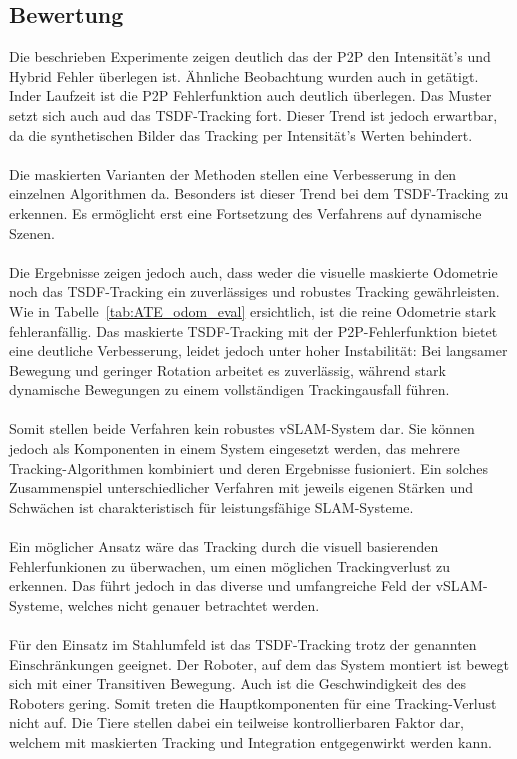 \documentclass[12pt,DIV=15,BCOR=15mm,twoside,headsepline,abstract=true,listof=totoc,bibliography=totoc]{scrreprt}
\theoremstyle{remark}    %
\begin{document}
    \subsection{Bewertung}
    Die beschrieben Experimente zeigen deutlich das der \ac{P2P} den Intensität's und Hybrid Fehler überlegen ist. Ähnliche Beobachtung wurden auch in 
    \cite{rusinkiewicz2001efficient} getätigt.
    Inder Laufzeit ist die \ac{P2P} Fehlerfunktion auch deutlich überlegen. 
    Das Muster setzt sich auch aud das \ac{TSDF}-Tracking fort. Dieser Trend ist jedoch erwartbar, da die synthetischen Bilder das Tracking per Intensität's Werten 
    behindert.\\\\
    Die  maskierten Varianten der Methoden stellen eine Verbesserung in den einzelnen Algorithmen da. Besonders ist dieser Trend bei dem \ac{TSDF}-Tracking
    zu erkennen. Es ermöglicht erst eine Fortsetzung des Verfahrens auf dynamische Szenen.\\\\
    Die Ergebnisse zeigen jedoch auch, dass weder die visuelle maskierte Odometrie noch das \ac{TSDF}-Tracking ein zuverlässiges und robustes Tracking gewährleisten.
    Wie in Tabelle~\ref{tab:ATE_odom_eval} ersichtlich, ist die reine Odometrie stark fehleranfällig.
    Das maskierte \ac{TSDF}-Tracking mit der \ac{P2P}-Fehlerfunktion bietet eine deutliche Verbesserung, leidet jedoch unter hoher Instabilität:
    Bei langsamer Bewegung und geringer Rotation arbeitet es zuverlässig, während stark dynamische Bewegungen zu einem vollständigen Trackingausfall führen.\\\\ 
    Somit stellen beide Verfahren kein robustes \ac{vSLAM}-System dar.
    Sie können jedoch als Komponenten in einem System eingesetzt werden, das mehrere Tracking-Algorithmen kombiniert und deren Ergebnisse fusioniert.
    Ein solches Zusammenspiel unterschiedlicher Verfahren mit jeweils eigenen Stärken und Schwächen ist charakteristisch für leistungsfähige \ac{SLAM}-Systeme.\\\\
    Ein möglicher Ansatz wäre das Tracking durch die visuell basierenden Fehlerfunkionen zu überwachen, um einen möglichen Trackingverlust zu erkennen.
    Das führt jedoch in das diverse und umfangreiche Feld der vSLAM-Systeme, welches nicht genauer betrachtet werden.\\\\
    Für den Einsatz im Stahlumfeld ist das \ac{TSDF}-Tracking trotz der genannten Einschränkungen geeignet. Der Roboter, auf dem das System montiert ist bewegt 
    sich mit einer Transitiven Bewegung. Auch ist die Geschwindigkeit des des Roboters gering. Somit treten die Hauptkomponenten für eine Tracking-Verlust 
    nicht auf. Die Tiere stellen dabei ein teilweise kontrollierbaren Faktor dar, welchem mit maskierten Tracking und Integration entgegenwirkt werden kann.
\end{document}
